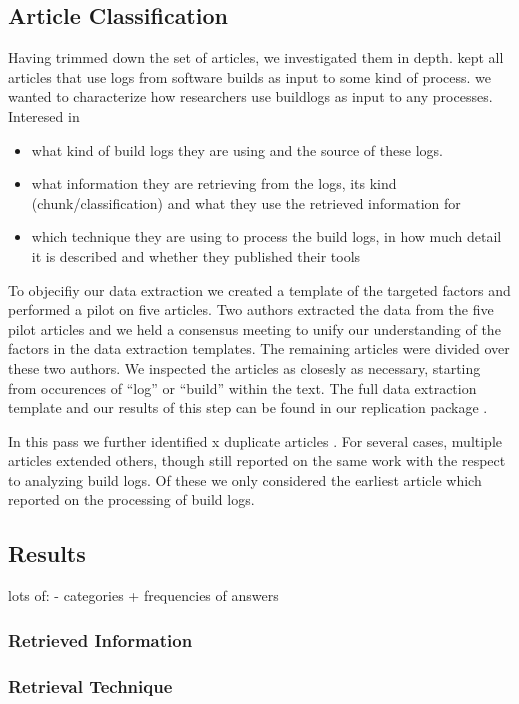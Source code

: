 \subsection{Article Classification}
Having trimmed down the set of articles, we investigated them in depth.
kept all articles that use logs from software builds as input to some
kind of process.
we wanted to characterize how researchers use buildlogs as input to
any processes.
Interesed in
\begin{itemize}
  \item what kind of build logs they are using and the source of these
  logs.
  \item what information they are retrieving from the logs,
  its kind (chunk/classification) and
  what they use the retrieved information for
  \item which technique they are using to process the build logs,
  in how much detail it is described and whether they published their
  tools
\end{itemize}
To objecifiy our data extraction we created a template of the targeted
factors
and performed a pilot on five articles.
Two authors extracted the data from the
five pilot articles and we held a consensus meeting to unify our
understanding
of the factors in the data extraction templates.
The remaining articles were
divided over these two authors.
We inspected the articles as closesly as necessary,
starting from occurences of ``log'' or ``build'' within the text.
The full data extraction template and our results of this step can be
found in
our replication package .

In this pass we further identified x duplicate articles .
For several cases, multiple articles extended others, though still
reported on
the same work with the respect to analyzing build logs.
Of these we only considered the earliest article which reported on
the processing
of build logs.

\subsection{Results}
lots of:
- categories + frequencies of answers

\subsubsection{Retrieved Information}

\subsubsection{Retrieval Technique}

